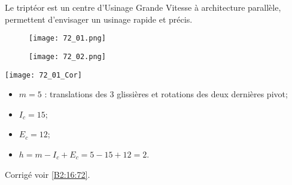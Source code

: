 \normaltrue \difficilefalse \tdifficilefalse
\correctiontrue

\setcounter{question}{0}


\ifcorrection
\else
{}
\fi

\ifprof
\else
Le triptéor est un centre d'Usinage Grande Vitesse à architecture parallèle, permettent d'envisager un usinage rapide et précis.


\begin{figure}[H]
\centering
\texttt{[image: 72\_01.png]}
\end{figure} 

\begin{figure}[H]
\centering
\texttt{[image: 72\_02.png]}
\end{figure} 
\fi

\ifprof
\begin{center}
\texttt{[image: 72\_01\_Cor]}
\end{center}
\else
\fi

\ifprof
\begin{itemize}
\item $m=5$ : translations des 3 glissières et rotations des deux dernières pivot;
\item $I_c=15$;
\item $E_c = 12$;
\item $h=m-I_c+E_c = 5 -15 + 12 = 2$.
\end{itemize}
\else
\fi
 

\ifprof
\else

\noindent\footnotesize
\normalsize

\begin{flushright}
\footnotesize{Corrigé  voir \ref{B2:16:72}.}
\end{flushright}%
\fi